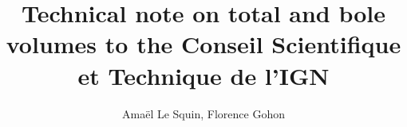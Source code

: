 \documentclass[oneside]{caesar_book}
\title{Technical note on total and bole volumes to the Conseil Scientifique et Technique de l'IGN}
\author{Amaël Le Squin, Florence Gohon}
\begin{document}
\frontmatter
\maketitlepage
\tableofcontents
\mainmatter






\printbibliography
\end{document}
